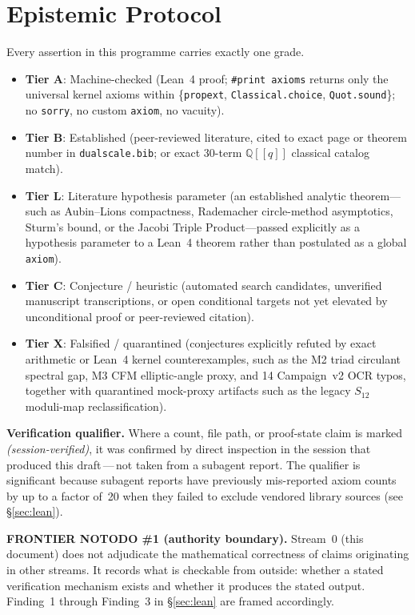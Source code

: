 \section{Epistemic Protocol}\label{sec:protocol}
Every assertion in this programme carries exactly one grade.
\begin{itemize}
    \item \textbf{Tier A}: Machine-checked (Lean~4 proof; \texttt{\#print axioms} returns
          only the universal kernel axioms within \{\texttt{propext},
          \texttt{Classical.choice}, \texttt{Quot.sound}\}; no \texttt{sorry},
          no custom \texttt{axiom}, no vacuity).
    \item \textbf{Tier B}: Established (peer-reviewed literature, cited to
          exact page or theorem number in \texttt{dualscale.bib}; or exact
          30-term $\mathbb{Q}[[q]]$ classical catalog match).
    \item \textbf{Tier L}: Literature hypothesis parameter (an established
          analytic theorem---such as Aubin--Lions compactness, Rademacher
          circle-method asymptotics, Sturm's bound, or the Jacobi Triple
          Product---passed explicitly as a hypothesis parameter to a Lean~4
          theorem rather than postulated as a global \texttt{axiom}).
    \item \textbf{Tier C}: Conjecture / heuristic (automated search candidates,
          unverified manuscript transcriptions, or open conditional targets
          not yet elevated by unconditional proof or peer-reviewed citation).
    \item \textbf{Tier X}: Falsified / quarantined (conjectures explicitly
          refuted by exact arithmetic or Lean~4 kernel counterexamples, such as
          the M2 triad circulant spectral gap, M3 CFM elliptic-angle proxy, and
          14 Campaign~v2 OCR typos, together with quarantined mock-proxy
          artifacts such as the legacy $S_{12}$ moduli-map reclassification).
\end{itemize}

\noindent
\textbf{Verification qualifier.}
Where a count, file path, or proof-state claim is marked
\emph{(session-verified)}, it was confirmed by direct inspection in the
session that produced this draft\,---\,not taken from a subagent report.
The qualifier is significant because subagent reports have previously
mis-reported axiom counts by up to a factor of~20 when they failed to
exclude vendored library sources (see §\ref{sec:lean}).

\noindent
\textbf{FRONTIER NOTODO \#1 (authority boundary).}
Stream~0 (this document) does not adjudicate the mathematical correctness
of claims originating in other streams.
It records what is checkable from outside: whether a stated verification
mechanism exists and whether it produces the stated output.
Finding~1 through Finding~3 in §\ref{sec:lean} are framed accordingly.
